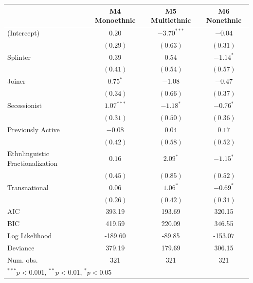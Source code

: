 \documentclass[12pt,]{book}
\let\origtable\table
\let\endorigtable\endtable
\renewenvironment{table}[1][2] {
    \singlespacing
    \expandafter\origtable\expandafter[H]
} {
    \endorigtable
}
\theoremstyle{definition}
\theoremstyle{definition}
\theoremstyle{remark}
\begin{document}
\begin{table}
\begin{center}
\begin{tabular}{l c c c }
\hline
 & M4 Monoethnic & M5 Multiethnic & M6 Nonethnic \\
\hline
(Intercept)                      & $0.20$       & $-3.70^{***}$ & $-0.04$     \\
                                 & $(0.29)$     & $(0.63)$      & $(0.31)$    \\
Splinter                         & $0.39$       & $0.54$        & $-1.14^{*}$ \\
                                 & $(0.41)$     & $(0.54)$      & $(0.57)$    \\
Joiner                           & $0.75^{*}$   & $-1.08$       & $-0.47$     \\
                                 & $(0.34)$     & $(0.66)$      & $(0.37)$    \\
Secessionist                     & $1.07^{***}$ & $-1.18^{*}$   & $-0.76^{*}$ \\
                                 & $(0.31)$     & $(0.50)$      & $(0.36)$    \\
Previously Active                & $-0.08$      & $0.04$        & $0.17$      \\
                                 & $(0.42)$     & $(0.58)$      & $(0.52)$    \\
Ethnlinguistic Fractionalization & $0.16$       & $2.09^{*}$    & $-1.15^{*}$ \\
                                 & $(0.45)$     & $(0.85)$      & $(0.52)$    \\
Transnational                    & $0.06$       & $1.06^{*}$    & $-0.69^{*}$ \\
                                 & $(0.26)$     & $(0.42)$      & $(0.31)$    \\
\hline
AIC                              & 393.19       & 193.69        & 320.15      \\
BIC                              & 419.59       & 220.09        & 346.55      \\
Log Likelihood                   & -189.60      & -89.85        & -153.07     \\
Deviance                         & 379.19       & 179.69        & 306.15      \\
Num. obs.                        & 321          & 321           & 321         \\
\hline
\multicolumn{4}{l}{\scriptsize{$^{***}p<0.001$, $^{**}p<0.01$, $^*p<0.05$}}
\end{tabular}
\caption{Logit Models of Rebel Group Ethnic Composition}
\label{tab:splintcomp}
\end{center}
\end{table}
\end{document}
